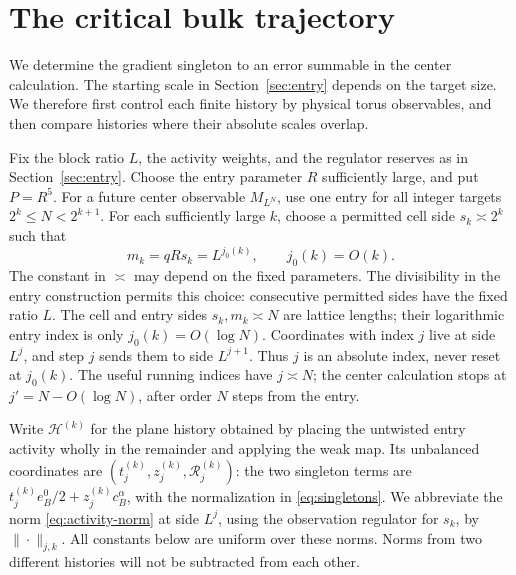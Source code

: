 \section{The critical bulk trajectory}\label{sec:trajectory}

We determine the gradient singleton to an error summable in the
center calculation.  The starting scale in Section~\ref{sec:entry}
depends on the target size.  We therefore first control each finite
history by physical torus observables, and then compare histories
where their absolute scales overlap.

Fix the block ratio \(L\), the activity weights, and the regulator
reserves as in Section~\ref{sec:entry}.  Choose
the entry parameter \(R\) sufficiently large, and put \(P=R^5\).
For a future center observable \(M_{L^N}\), use one entry for all
integer targets \(2^k\le N<2^{k+1}\).  For each sufficiently large
\(k\), choose a permitted cell side \(s_k\asymp 2^k\) such that
\begin{equation}\label{trj:starts}
 m_k=qRs_k=L^{j_0(k)},\qquad j_0(k)=O(k).
\end{equation}
The constant in \(\asymp\) may depend on the fixed parameters.  The
divisibility in the entry construction permits this choice: consecutive
permitted sides have the fixed ratio \(L\).  The cell and entry sides
\(s_k,m_k\asymp N\) are lattice lengths; their logarithmic entry index
is only \(j_0(k)=O(\log N)\).  Coordinates with index \(j\) live at
side \(L^j\), and step \(j\) sends them to side \(L^{j+1}\).  Thus
\(j\) is an absolute index, never reset at \(j_0(k)\).  The useful
running indices have \(j\asymp N\); the center calculation stops at
\(j'=N-O(\log N)\), after order \(N\) steps from the entry.

Write \(\mathcal H^{(k)}\) for the plane history obtained by placing the
untwisted entry activity wholly in the remainder and applying the weak
map.  Its unbalanced coordinates are
\((t_j^{(k)},z_j^{(k)},\mathcal R_j^{(k)})\): the two singleton terms are
\(t_j^{(k)}e_B^0/2+z_j^{(k)}c_B^\alpha\), with the normalization in
\eqref{eq:singletons}.  We abbreviate the norm
\eqref{eq:activity-norm} at side \(L^j\), using the observation regulator
for \(s_k\), by \(\|\cdot\|_{j,k}\).  All constants below are uniform
over these norms.  Norms from two different histories will not be
subtracted from each other.

